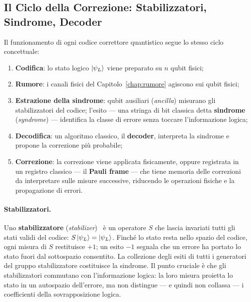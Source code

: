 \begin{onehalfspace}
\section{Il Ciclo della Correzione: Stabilizzatori, Sindrome, Decoder}
\label{sec:ciclo_qec}

Il funzionamento di ogni codice correttore quantistico segue lo stesso ciclo concettuale:

\begin{enumerate}
    \item \textbf{Codifica}: lo stato logico $\ket{\psi_L}$ viene preparato su $n$ qubit fisici;
    \item \textbf{Rumore}: i canali fisici del Capitolo~\ref{chap:rumore} agiscono sui qubit fisici;
    \item \textbf{Estrazione della sindrome}: qubit ausiliari (\textit{ancilla}) misurano gli stabilizzatori del codice; l'esito --- una stringa di bit classica detta \textbf{sindrome} (\textit{syndrome}) --- identifica la classe di errore senza toccare l'informazione logica;
    \item \textbf{Decodifica}: un algoritmo classico, il \textbf{decoder}, interpreta la sindrome e propone la correzione più probabile;
    \item \textbf{Correzione}: la correzione viene applicata fisicamente, oppure registrata in un registro classico --- il \textbf{Pauli frame} --- che tiene memoria delle correzioni da interpretare sulle misure successive, riducendo le operazioni fisiche e la propagazione di errori.
\end{enumerate}

\paragraph{Stabilizzatori.}
Uno \textbf{stabilizzatore} (\textit{stabilizer})~\cite{gottesman1997} è un operatore $S$ che lascia invariati tutti gli stati validi del codice: $S\ket{\psi_L} = \ket{\psi_L}$. Finché lo stato resta nello spazio del codice, ogni misura di $S$ restituisce $+1$; un esito $-1$ segnala che un errore ha portato lo stato fuori dal sottospazio consentito. La collezione degli esiti di tutti i generatori del gruppo stabilizzatore costituisce la sindrome. Il punto cruciale è che gli stabilizzatori commutano con l'informazione logica: la loro misura proietta lo stato in un autospazio dell'errore, ma non distingue --- e quindi non collassa --- i coefficienti della sovrapposizione logica.


\end{onehalfspace}
